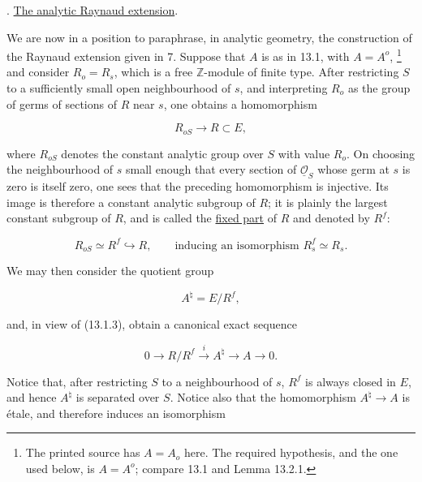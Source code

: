 \medskip
{}. \underline{The analytic Raynaud extension}.

We are now in a position to paraphrase, in analytic geometry, the
construction of the Raynaud extension given in 7. Suppose that $A$ is
as in 13.1, with $A=A^o$,
\footnote{The printed source has $A=A_o$ here. The required hypothesis,
and the one used below, is $A=A^o$; compare 13.1 and Lemma 13.2.1.}
and consider $R_o=R_s$, which is a free $\mathbb Z$-module of finite
type. After restricting $S$ to a sufficiently small open neighbourhood
of $s$, and interpreting $R_o$ as the group of germs of sections of $R$
near $s$, one obtains a homomorphism

\begin{equation}\tag{13.3.1}
 R_{oS}\longrightarrow R\subset E,
\end{equation}

\noindent
where $R_{oS}$ denotes the constant analytic group over $S$ with value
$R_o$. On choosing the neighbourhood of $s$ small enough that every
section of $\underline{\mathcal O}_S$ whose germ at $s$ is zero is itself
zero, one sees that the preceding homomorphism is injective. Its image is
therefore a constant analytic subgroup of $R$; it is plainly the largest
constant subgroup of $R$, and is called the \underline{fixed part} of
$R$ and denoted by $R^f$:

\begin{equation}\tag{13.3.2}
 R_{oS}\simeq R^f\hookrightarrow R,
 \qquad\text{inducing an isomorphism }R_s^f\simeq R_s.
\end{equation}

\noindent
We may then consider the quotient group

\begin{equation}\tag{13.3.3}
 A^\natural=E/R^f,
\end{equation}

\noindent
and, in view of (13.1.3), obtain a canonical exact sequence

\begin{equation}\tag{13.3.4}
 0\longrightarrow R/R^f\stackrel{i}{\longrightarrow}A^\natural
 \longrightarrow A\longrightarrow0.
\end{equation}

\noindent
Notice that, after restricting $S$ to a neighbourhood of $s$, $R^f$ is
always closed in $E$, and hence $A^\natural$ is separated over $S$.
Notice also that the homomorphism $A^\natural\longrightarrow A$ is
\'etale, and therefore induces an isomorphism

